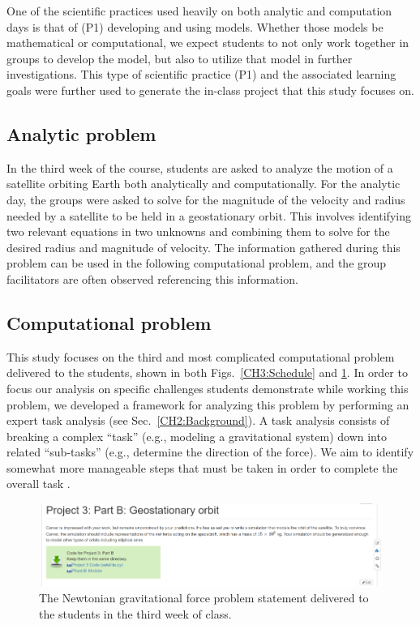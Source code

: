 \documentclass{msuphddissertation}
\begin{document}
\begin{doublespace}
One of the scientific practices used heavily on both analytic and computation days is that of (P1) developing and using models.  Whether those models be mathematical or computational, we expect students to not only work together in groups to develop the model, but also to utilize that model in further investigations.  This type of scientific practice (P1) and the associated learning goals\cite{Irving2017} were further used to generate the in-class project that this study focuses on.

\subsection{Analytic problem}

In the third week of the course, students are asked to analyze the motion of a satellite orbiting Earth both analytically and computationally.  For the analytic day, the groups were asked to solve for the magnitude of the velocity and radius needed by a satellite to be held in a geostationary orbit.  This involves identifying two relevant equations in two unknowns and combining them to solve for the desired radius and magnitude of velocity.  The information gathered during this problem can be used in the following computational problem, and the group facilitators are often observed referencing this information.

\subsection{Computational problem}

This study focuses on the third and most complicated computational problem delivered to the students, shown in both Figs.~\ref{CH3:Schedule} and \ref{CH3:SatelliteProblem}. In order to focus our analysis on specific challenges students demonstrate while working this problem, we developed a framework for analyzing this problem by performing an expert task analysis (see Sec.~\ref{CH2:Background}).  A task analysis consists of breaking a complex ``task'' (e.g., modeling a gravitational system) down into related ``sub-tasks'' (e.g., determine the direction of the force). We aim to identify somewhat more manageable steps that must be taken in order to complete the overall task \cite{Catrambone1998}.

\begin{figure}[ht]\centering
\includegraphics[scale=1]{images/CH3SatelliteProblem.pdf}
\caption{The Newtonian gravitational force problem statement delivered to the students in the third week of class.}\label{CH3:SatelliteProblem}
\end{figure}


\end{doublespace}
\end{document}
